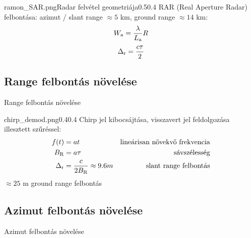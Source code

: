 \documentclass[aspectratio=169]{beamer}
\begin{document}
\begin{frame}{\ft}
    \begin{figp}{ramon_SAR.png}{Radar felvétel geometriája}{0.5}{0.4}
        RAR (Real Aperture Radar) felbontása: azimut / slant range $\approx 5$ km, ground range $\approx 14$ km:
        $$ W_{\text{a}} = \frac{\lambda}{L_{\text{a}}} R $$
        $$ \Delta_{\text{r}} = \frac{c\tau}{2} $$
    \end{figp}
\end{frame}

\def\ft{Range felbontás növelése}
\subsection{\ft}

\begin{frame}{\ft}
    \begin{figp}{chirp_demod.png}{}{0.4}{0.4}
        Chirp jel kibocsájtása, visszavert jel feldolgozása illesztett szűréssel:
        \begin{align*}
            f(t) &= a t & \text{lineárisan növekvő frekvencia} \\
            B_{\text{R}} &= a \tau & \text{sávszélesség} \\
            \Delta_{\text{r}} &= \frac{c}{2 B_{\text{R}}} \approx 9.6 m & \text{slant range felbontás}
        \end{align*}
        $\approx 25$ m ground range felbontás
    \end{figp}
\end{frame}

\def\ft{Azimut felbontás növelése}
\subsection{\ft}

\begin{frame}{\ft}
    \begin{center}
    \begin{minipage}[c]{0.45\textwidth}
    \end{minipage}
    \hspace{10pt}
    \begin{minipage}[c]{0.45\textwidth}
    \end{minipage}
    \end{center}
\end{frame}


\def\ft{Nyers SAR felvétel fókuszálása}
\end{document}
